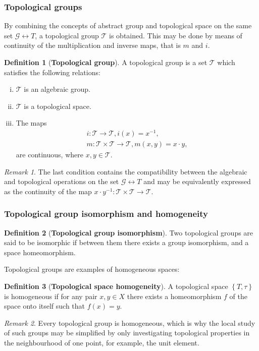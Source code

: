 \documentclass[12pt,a4paper]{report}
\theoremstyle{definition}
\newtheorem{definition}{Definition}
\theoremstyle{remark}
\newtheorem*{remark}{Remark}
\theoremstyle{remark}
\begin{document}
\subsubsection{Topological groups}
By combining the concepts of abstract group and topological space on the same set $\mathcal{G}\leftrightarrow T$, a topological group $\mathcal{T}$ is obtained. This may be done by means of continuity of the multiplication and inverse maps, that is $m$ and $i$.
\begin{definition}[\textbf{Topological group}]
A topological group is a set $\mathcal{T}$ which satisfies the following relations:
\begin{enumerate}[i.]
\item $\mathcal{T}$ is an algebraic group.
\item $\mathcal{T}$ is a topological space.
\item The maps 
\begin{align*}
i:\mathcal{T}\rightarrow\mathcal{T},i(x)=x^{-1},\\
m:\mathcal{T}\times\mathcal{T}\rightarrow\mathcal{T},m(x,y)=x\cdot y,
\end{align*}
are continuous, where $x,y\in\mathcal{T}$.
\end{enumerate}
\end{definition}
\begin{remark} The last condition contains the compatibility between the algebraic and topological operations on the set $\mathcal{G}\leftrightarrow T$ and may be equivalently expressed as the continuity of the map $x\cdot y^{-1}:\mathcal{T}\times\mathcal{T}\rightarrow\mathcal{T}$.
\end{remark}

\subsubsection{Topological group isomorphism and homogeneity}
\begin{definition}[\textbf{Topological group isomorphism}]
Two topological groups are said to be isomorphic if between them there exists a group isomorphism, and a space homeomorphism.
\end{definition}
Topological groups are examples of homogeneous spaces:
\begin{definition}[\textbf{Topological space homogeneity}]
A topological space $\left\lbrace T,\tau \right\rbrace$ is homogeneous if for any pair $x,y\in X$ there exists a homeomorphism $f$ of the space onto itself such that $f(x)=y$.
\end{definition}
\begin{remark}
Every topological group is homogeneous, which is why the local study of such groups may be simplified by only investigating topological properties in the neighbourhood of one point, for example, the unit element.
\end{remark}
\end{document}
